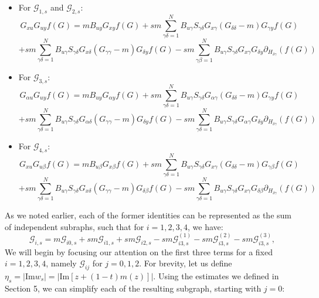 \documentclass[11pt]{article}
\begin{document}
\begin{itemize}
\item For $\mathcal{G}_{1, s}$ and $\mathcal{G}_{2, s}$: \begin{equation*}
G_{xu}G_{uy}f(G) = mB_{uy}G_{xy} f(G) + sm\sum_{\gamma\delta=1}^N B_{u\gamma} S_{\gamma\delta} G_{x\gamma}(G_{\delta\delta}-m)G_{\gamma y} f(G)
\end{equation*}
$$+sm\sum_{\gamma\delta=1}^N B_{u\gamma} S_{\gamma\delta} G_{x\delta}(G_{\gamma\gamma}-m)G_{\delta y}f(G)-sm\sum_{\gamma\beta=1}^N B_{u\gamma}S_{\gamma\delta}G_{x\gamma}G_{\delta y}\partial_{H_{\delta \gamma}}(f(G))$$
\item For $\mathcal{G}_{3, s}$:
\begin{equation*}
G_{\alpha u}G_{uy}f(G) = mB_{uy}G_{\alpha y} f(G) + sm\sum_{\gamma\delta=1}^N B_{u\gamma} S_{\gamma\delta} G_{\alpha\gamma}(G_{\delta\delta}-m)G_{\gamma y} f(G)
\end{equation*}
$$+sm\sum_{\gamma\delta=1}^N B_{u\gamma} S_{\gamma\delta} G_{\alpha\delta}(G_{\gamma\gamma}-m)G_{\delta y}f(G)-sm\sum_{\gamma\delta=1}^N B_{u\gamma}S_{\gamma\delta}G_{\alpha\gamma}G_{\delta y}\partial_{H_{\delta \gamma}}(f(G))$$
\item For $\mathcal{G}_{4, s}$:
\begin{equation*}
G_{xu}G_{u\beta}f(G) = mB_{u\beta}G_{x\beta} f(G) + sm\sum_{\gamma\delta=1}^N B_{u\gamma} S_{\gamma\delta} G_{x\gamma}(G_{\delta\delta}-m)G_{\gamma \beta} f(G)
\end{equation*}
$$+sm\sum_{\gamma\delta=1}^N B_{u\gamma} S_{\gamma\delta} G_{x\delta}(G_{\gamma\gamma}-m)G_{\delta \beta}f(G)-sm\sum_{\gamma\delta=1}^N B_{u\gamma}S_{\gamma\delta}G_{x\gamma}G_{\delta \beta}\partial_{H_{\delta \gamma}}(f(G))$$
\end{itemize}
As we noted earlier, each of the former identities can be represented as the sum of independent subraphs, such that for $i=1, 2, 3, 4$, we have:
$$\mathcal{G}_{i, s} = m\mathcal{G}_{i0, s}+sm\mathcal{G}_{i1,s}+sm\mathcal{G}_{i2, s}-sm\mathcal{G}_{i3,s}^{(1)}-sm\mathcal{G}_{i3,s}^{(2)}-sm\mathcal{G}_{i3,s}^{(3)},$$
We will begin by focusing our attention on the first three terms for a fixed $i=1, 2, 3, 4$, namely $\mathcal{G}_{ij}$ for $j=0, 1, 2$. For brevity, let us define $\eta_s = \left\vert \text{Im}w_s\right\vert = \left\vert \text{Im}[z+(1-t)m(z)]\right\vert$. 
Using the estimates we defined in Section 5, we can simplify each of the resulting subgraph, starting with $j=0$:
\end{document}

